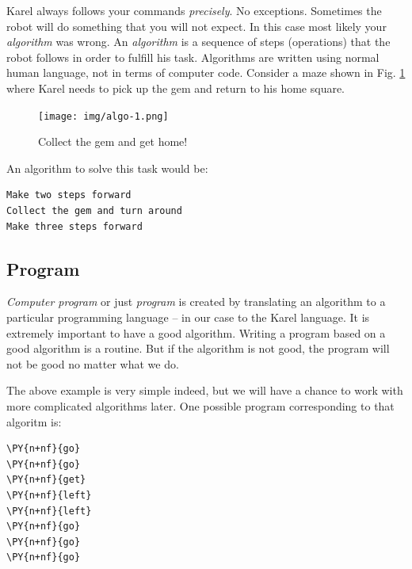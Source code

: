 Karel always follows your commands {\em precisely}. No exceptions. Sometimes
the robot will do something that you will not expect. In this case most likely your 
{\em algorithm} was wrong. An {\em algorithm} is a sequence of 
steps (operations) that the robot follows in order to fulfill his task. Algorithms 
are written using normal human language, not in terms of computer code. Consider
a maze shown in Fig. \ref{fig:algo-1} where Karel needs to pick up the gem and 
return to his home square.

\begin{figure}[!ht]
\begin{center}
\texttt{[image: img/algo-1.png]}
\vspace{-0mm}
\caption{Collect the gem and get home!}
\label{fig:algo-1}
\end{center}
\end{figure}
\noindent
An algorithm to solve this task would be:

\begin{verbatim}
Make two steps forward
Collect the gem and turn around
Make three steps forward
\end{verbatim}

\subsection{Program}

{\em Computer program} or just {\em program} is created by translating an algorithm 
to a particular programming language -- in our case to the Karel language. It is 
extremely important to have a good algorithm. Writing a program based on a good
algorithm is a routine. But if the algorithm is not good, the program will not 
be good no matter what we do. 

The above example is very simple indeed, but we will have a chance to work with more complicated 
algorithms later. One possible program corresponding to that algoritm is:\\

\begin{bbox}
\begin{Verbatim}[commandchars=\\\{\}]
\PY{n+nf}{go}
\PY{n+nf}{go}
\PY{n+nf}{get}
\PY{n+nf}{left}
\PY{n+nf}{left}
\PY{n+nf}{go}
\PY{n+nf}{go}
\PY{n+nf}{go}
\end{Verbatim}
\end{bbox}
\vspace{6mm}

